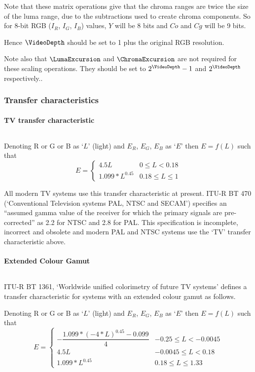 \begin{informative*}
Note that these matrix operations give that the chroma ranges are twice the
size of the luma range, due to the subtractions used to create chroma components. 
So for 8-bit RGB ($I_R$, $I_G$, $I_B$) values, $Y$ will be 8 bits and $Co$ and
$Cg$ will be 9 bits. 

Hence $\VideoDepth$ should be set to 1 plus the original RGB resolution.

Note also that $\LumaExcursion$ and $\ChromaExcursion$ are not required for
these scaling operations. They should be set to $2^\VideoDepth-1$ and $2^\VideoDepth$
respectively..

\subsubsection{Transfer characteristics}
\paragraph{TV transfer characteristic}
$\ $\newline

Denoting R or G or B as `$L$' (light) and $E_R$, $E_G$, $E_B$ as
`$E$' then $E=f(L)$ such that
\[
E=\left\{
        \begin{array}{ll}
        4.5L & 0\leq L<0.18\\
        1.099*L^{0.45} &0.18\leq L \leq 1
        \end{array}
  \right.
\]

All modern TV systems use this transfer characteristic at present. ITU-R
BT 470 (`Conventional Television systems PAL, NTSC and SECAM') specifies
an ``assumed gamma value of the receiver for which the primary
signals are pre-corrected'' as 2.2 for NTSC and 2.8 for PAL. This
specification is incomplete, incorrect and obsolete and modern PAL and
NTSC systems use the `TV' transfer characteristic above.

\paragraph{Extended Colour Gamut}
$\ $\newline

ITU-R BT 1361, `Worldwide unified colorimetry of future TV systems'
defines a transfer characteristic for systems with an extended colour
gamut as follows.

Denoting R or G or B as `$L$' (light) and $E_R$, $E_G$, $E_B$ as
`$E$' then $E=f(L)$ such that
\[
E=\left\{
        \begin{array}{ll}
        -\dfrac{1.099*(-4*L)^{0.45}-0.099}{4} & -0.25\leq L<-0.0045\\
        4.5L & -0.0045\leq L<0.18\\
        1.099*L^{0.45} &0.18\leq L \leq 1.33
        

\end{array}\]
\end{informative*}
